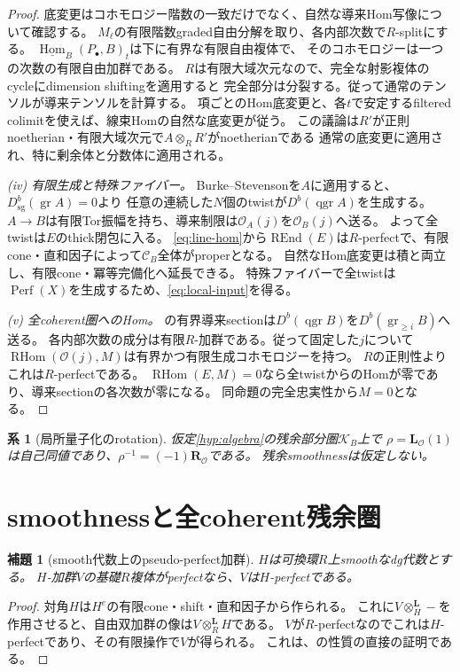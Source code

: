 \documentclass[a4paper,10pt]{ltjsarticle}
\newtheorem{lemma}[theorem]{補題}
\newtheorem{corollary}[theorem]{系}
\theoremstyle{definition}
\theoremstyle{remark}
\newcommand{\Perf}{\operatorname{Perf}}
\newcommand{\RHom}{\operatorname{RHom}}
\newcommand{\REnd}{\operatorname{REnd}}
\newcommand{\qgr}{\operatorname{qgr}}
\newcommand{\gr}{\operatorname{gr}}
\newcommand{\Dsg}{D_{\mathrm{sg}}^b}
\newcommand{\OO}{\mathcal O}
\newcommand{\cC}{\mathcal C}
\newcommand{\cK}{\mathcal K}
\newcommand{\otL}{\otimes^{\mathbf L}}
\newcommand{\LL}{\mathbf L}
\newcommand{\RR}{\mathbf R}
\begin{document}
\begin{proof}
底変更はコホモロジー階数の一致だけでなく、自然な導来Hom写像について確認する。
$M_\ell$の有限階数graded自由分解を取り、各内部次数で$R$-splitにする。
$\underline{\operatorname{Hom}}_B(P_\bullet,B)_t$は下に有界な有限自由複体で、
そのコホモロジーは一つの次数の有限自由加群である。
$R$は有限大域次元なので、完全な射影複体のcycleにdimension shiftingを適用すると
完全部分は分裂する。従って通常のテンソルが導来テンソルを計算する。
項ごとのHom底変更と、各$t$で安定するfiltered colimitを使えば、線束Homの自然な底変更が従う。
この議論は$R'\!$が正則noetherian・有限大域次元で$A\otimes_RR'$がnoetherianである
通常の底変更に適用され、特に剰余体と分数体に適用される。

\emph{(iv) 有限生成と特殊ファイバー。}
Burke--Stevenson\cite[Theorem 6.4]{BS}を$A$に適用すると、$\Dsg(\gr A)=0$より
任意の連続した$N$個のtwistが$D^b(\qgr A)$を生成する。
$A\to B$は有限Tor振幅を持ち、導来制限は$\OO_A(j)$を$\OO_B(j)$へ送る。
よって全twistは$E$のthick閉包に入る。
\eqref{eq:line-hom}から$\REnd(E)$は$R$-perfectで、有限cone・直和因子によって$\cC_B$全体がproperとなる。
自然なHom底変更は積と両立し、有限cone・冪等完備化へ延長できる。
特殊ファイバーで全twistは$\Perf(X)$を生成するため、\eqref{eq:local-input}を得る。

\emph{(v) 全coherent圏へのHom。}
\cite[Proposition 4.18]{BS}の有界導来sectionは$D^b(\qgr B)$を$D^b(\gr_{\ge i}B)$へ送る。
各内部次数の成分は有限$R$-加群である。従って固定した$j$について
$\RHom(\OO(j),M)$は有界かつ有限生成コホモロジーを持つ。
$R$の正則性よりこれは$R$-perfectである。
$\RHom(E,M)=0$なら全twistからのHomが零であり、導来sectionの各次数が零になる。
同命題の完全忠実性から$M=0$となる。
\end{proof}

\begin{corollary}[局所量子化のrotation]\label{cor:local-rotation}
仮定\ref{hyp:algebra}の残余部分圏$\cK_B$上で
$\rho=\LL_{\OO}(1)$は自己同値であり、$\rho^{-1}=(-1)\RR_{\OO}$である。
残余smoothnessは仮定しない。
\end{corollary}

\section{smoothnessと全coherent残余圏}\label{sec:fullness}
\begin{lemma}[smooth代数上のpseudo-perfect加群]\label{lem:pseudoperfect}
$H$は可換環$R$上smoothなdg代数とする。
$H$-加群$V$の基礎$R$複体がperfectなら、$V$は$H$-perfectである。
\end{lemma}
\begin{proof}
対角$H$は$H^e$の有限cone・shift・直和因子から作られる。
これに$V\otL_H-$を作用させると、自由双加群の像は$V\otL_RH$である。
$V$が$R$-perfectなのでこれは$H$-perfectであり、その有限操作で$V$が得られる。
これは\cite[Lemma 2.8(2)]{TV}、\cite[F6]{Toen}の性質の直接の証明である。
\end{proof}
\end{document}
